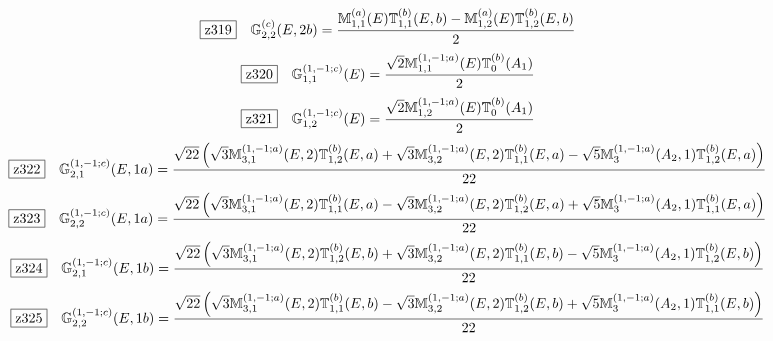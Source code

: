 \documentclass[fleqn,10pt,landscape]{jsarticle}
\begin{document}
\begin{dmath*}
\hspace*{3mm}\fbox{z319}\quad \mathbb{G}_{2,2}^{(c)}(E,2b)=\frac{\mathbb{M}_{1,1}^{(a)}(E) \mathbb{T}_{1,1}^{(b)}(E,b) - \mathbb{M}_{1,2}^{(a)}(E) \mathbb{T}_{1,2}^{(b)}(E,b)}{2}
\end{dmath*}
\begin{dmath*}
\hspace*{3mm}\fbox{z320}\quad \mathbb{G}_{1,1}^{(1,-1;c)}(E)=\frac{\sqrt{2} \mathbb{M}_{1,1}^{(1,-1;a)}(E) \mathbb{T}_{0}^{(b)}(A_{1})}{2}
\end{dmath*}
\begin{dmath*}
\hspace*{3mm}\fbox{z321}\quad \mathbb{G}_{1,2}^{(1,-1;c)}(E)=\frac{\sqrt{2} \mathbb{M}_{1,2}^{(1,-1;a)}(E) \mathbb{T}_{0}^{(b)}(A_{1})}{2}
\end{dmath*}
\begin{dmath*}
\hspace*{3mm}\fbox{z322}\quad \mathbb{G}_{2,1}^{(1,-1;c)}(E,1a)=\frac{\sqrt{22} \left(\sqrt{3} \mathbb{M}_{3,1}^{(1,-1;a)}(E,2) \mathbb{T}_{1,2}^{(b)}(E,a) + \sqrt{3} \mathbb{M}_{3,2}^{(1,-1;a)}(E,2) \mathbb{T}_{1,1}^{(b)}(E,a) - \sqrt{5} \mathbb{M}_{3}^{(1,-1;a)}(A_{2},1) \mathbb{T}_{1,2}^{(b)}(E,a)\right)}{22}
\end{dmath*}
\begin{dmath*}
\hspace*{3mm}\fbox{z323}\quad \mathbb{G}_{2,2}^{(1,-1;c)}(E,1a)=\frac{\sqrt{22} \left(\sqrt{3} \mathbb{M}_{3,1}^{(1,-1;a)}(E,2) \mathbb{T}_{1,1}^{(b)}(E,a) - \sqrt{3} \mathbb{M}_{3,2}^{(1,-1;a)}(E,2) \mathbb{T}_{1,2}^{(b)}(E,a) + \sqrt{5} \mathbb{M}_{3}^{(1,-1;a)}(A_{2},1) \mathbb{T}_{1,1}^{(b)}(E,a)\right)}{22}
\end{dmath*}
\begin{dmath*}
\hspace*{3mm}\fbox{z324}\quad \mathbb{G}_{2,1}^{(1,-1;c)}(E,1b)=\frac{\sqrt{22} \left(\sqrt{3} \mathbb{M}_{3,1}^{(1,-1;a)}(E,2) \mathbb{T}_{1,2}^{(b)}(E,b) + \sqrt{3} \mathbb{M}_{3,2}^{(1,-1;a)}(E,2) \mathbb{T}_{1,1}^{(b)}(E,b) - \sqrt{5} \mathbb{M}_{3}^{(1,-1;a)}(A_{2},1) \mathbb{T}_{1,2}^{(b)}(E,b)\right)}{22}
\end{dmath*}
\begin{dmath*}
\hspace*{3mm}\fbox{z325}\quad \mathbb{G}_{2,2}^{(1,-1;c)}(E,1b)=\frac{\sqrt{22} \left(\sqrt{3} \mathbb{M}_{3,1}^{(1,-1;a)}(E,2) \mathbb{T}_{1,1}^{(b)}(E,b) - \sqrt{3} \mathbb{M}_{3,2}^{(1,-1;a)}(E,2) \mathbb{T}_{1,2}^{(b)}(E,b) + \sqrt{5} \mathbb{M}_{3}^{(1,-1;a)}(A_{2},1) \mathbb{T}_{1,1}^{(b)}(E,b)\right)}{22}
\end{dmath*}
\end{document}
